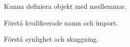 
\item Kunna definiera objekt med medlemmar.
\item Förstå kvalificerade namn och import.
\item Förstå synlighet och skuggning.

